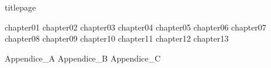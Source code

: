 \documentclass[
	,a4paper
	,12pt
	,oneside
]{book}
\begin{document}
\frontmatter

	{titlepage}
	\tableofcontents

\mainmatter

	{chapter01}
	{chapter02}
	{chapter03}
	{chapter04}
	{chapter05}
	{chapter06}
	{chapter07}
	{chapter08}
	{chapter09}
	{chapter10}
	{chapter11}
	{chapter12}
	{chapter13}

	\appendix
	{Appendice_A}
	{Appendice_B}
	{Appendice_C}
\backmatter
\end{document}
